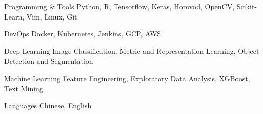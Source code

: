 

\begin{cvskills}

  \cvskill
    {Programming \& Tools} %
    {Python, R, Tensorflow, Keras, Horovod, OpenCV, Scikit-Learn, Vim, Linux, Git} %

  \cvskill
    {DevOps} %
    {Docker, Kubernetes, Jenkins, GCP, AWS} %

  \cvskill
    {Deep Learning} %
    {Image Classification, Metric and Representation Learning, Object Detection and Segmentation} %

  \cvskill
    {Machine Learning} %
    {Feature Engineering, Exploratory Data Analysis, XGBoost, Text Mining} %

  \cvskill
    {Languages} %
    {Chinese, English} %

\end{cvskills}
